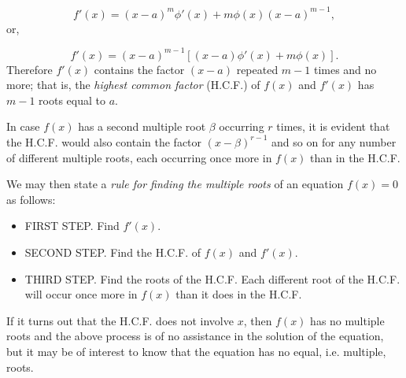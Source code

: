 \[
  f'(x) = (x-a)^m\phi '(x) + m\phi (x)(x - a)^{m - 1},
\]
or,

\begin{equation}	
f'(x) = (x-a)^{m - 1}[(x - a)\phi '(x) + m\phi (x)].
\label{eqn:C-69}
\end{equation}
Therefore $f'(x)$ contains the factor $(x - a)$ repeated $m - 1$ 
times and no more; that is, the {\it highest common factor} (H.C.F.) 
of $f(x)$ and $f'(x)$ has $m - 1$ roots equal to $a$.

In case $f(x)$ has a second multiple root $\beta$ occurring $r$ times, 
it is evident that the H.C.F. would also contain the factor 
$(x -\beta)^{r - 1}$ and so on for any number of different 
multiple roots, each occurring once more in $f(x)$ than in the H.C.F.

We may then state a {\it rule for finding the multiple roots} 
of an equation $f(x) = 0$ as follows:

\begin{itemize}
\item
FIRST STEP. Find $f'(x)$.

\item
SECOND STEP. Find the H.C.F. of $f(x)$ and $f'(x)$.

\item
THIRD STEP. Find the roots of the H.C.F. Each different 
root of the H.C.F. will occur once more in $f(x)$ than it does in the H.C.F.
\end{itemize}
If it turns out that the H.C.F. does not involve $x$, then $f(x)$ 
has no multiple roots and the above process is of no assistance 
in the solution of the equation, but it may be of interest to know 
that the equation has no equal, i.e. multiple, roots.


